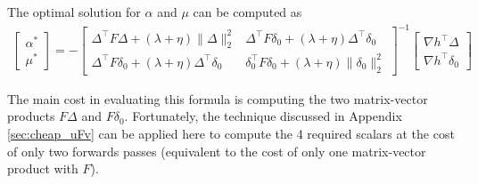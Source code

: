 \documentclass[12pt]{article}
\newcommand{\ospan}{\operatorname{span}}
\begin{document}
The optimal solution for $\alpha$ and $\mu$ can be computed as
\begin{align*}
\begin{bmatrix}
\alpha^* \\ \mu^*
\end{bmatrix}
= -
\begin{bmatrix}
\Delta^\top F \Delta + (\lambda + \eta)\|\Delta\|_2^2  & \Delta^\top F \delta_0 + (\lambda + \eta) \Delta^\top \delta_0\\
\Delta^\top F \delta_0 + (\lambda + \eta) \Delta^\top \delta_0 & \delta_0^\top F \delta_0 + (\lambda + \eta)\|\delta_0\|_2^2
\end{bmatrix}^{-1}
\begin{bmatrix}
\nabla h^\top \Delta \\ \nabla h^\top \delta_0
\end{bmatrix}
\end{align*}

The main cost in evaluating this formula is computing the two matrix-vector products $F \Delta$ and $F \delta_0$.  Fortunately, the technique discussed in Appendix \ref{sec:cheap_uFv} can be applied here to compute the 4 required scalars at the cost of only two forwards passes (equivalent to the cost of only one matrix-vector product with $F$).

\end{document}
